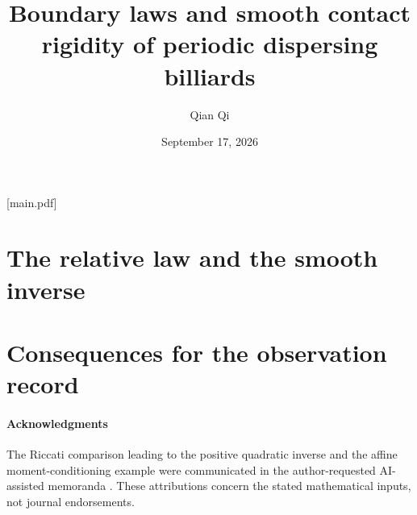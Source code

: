 
[main.pdf]
\title[Boundary laws and smooth contact rigidity]{Boundary laws and smooth contact rigidity of periodic dispersing billiards}
\author{Qian Qi}
\date{September 17, 2026}


\begin{abstract}

\end{abstract}
\maketitle
\setcounter{tocdepth}{1}
\tableofcontents

\part{The relative law and the smooth inverse}






\part{Consequences for the observation record}




\subsection*{Acknowledgments}
The Riccati comparison leading to the positive quadratic inverse and the
affine moment-conditioning example were communicated in the author-requested
AI-assisted memoranda \cite{A2ReviewV65,A2ReviewV74}.  These attributions
concern the stated mathematical inputs, not journal endorsements.
\appendix
\renewcommand{\theHsection}{principal.appendix.\arabic{section}}



